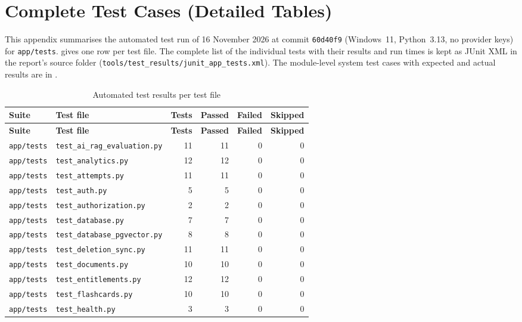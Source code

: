 \chapter{Complete Test Cases (Detailed Tables)}\label{app:tests}

This appendix summarises the automated test run of 16 November 2026 at commit \texttt{60d40f9}
(Windows~11, Python~3.13, no provider keys) for \texttt{app/tests}.  gives one row per
test file. The complete list of the individual tests with their results and run times is kept as JUnit XML
in the report's source folder (\texttt{tools/test\_results/junit\_app\_tests.xml}). The module-level system test cases with expected and
actual results are in .

{\small{}
\begin{longtable}{@{}l l r r r r@{}}
\caption{Automated test results per test file}\label{tab:fulltc}\\
\toprule
\textbf{Suite} & \textbf{Test file} & \textbf{Tests} & \textbf{Passed} & \textbf{Failed} & \textbf{Skipped}\\
\midrule
\endfirsthead
\toprule
\textbf{Suite} & \textbf{Test file} & \textbf{Tests} & \textbf{Passed} & \textbf{Failed} & \textbf{Skipped}\\
\midrule
\endhead
\bottomrule
\endfoot
\texttt{app/tests} & \texttt{test\_ai\_rag\_evaluation.py} & 11 & 11 & 0 & 0\\
\texttt{app/tests} & \texttt{test\_analytics.py} & 12 & 12 & 0 & 0\\
\texttt{app/tests} & \texttt{test\_attempts.py} & 11 & 11 & 0 & 0\\
\texttt{app/tests} & \texttt{test\_auth.py} & 5 & 5 & 0 & 0\\
\texttt{app/tests} & \texttt{test\_authorization.py} & 2 & 2 & 0 & 0\\
\texttt{app/tests} & \texttt{test\_database.py} & 7 & 7 & 0 & 0\\
\texttt{app/tests} & \texttt{test\_database\_pgvector.py} & 8 & 8 & 0 & 0\\
\texttt{app/tests} & \texttt{test\_deletion\_sync.py} & 11 & 11 & 0 & 0\\
\texttt{app/tests} & \texttt{test\_documents.py} & 10 & 10 & 0 & 0\\
\texttt{app/tests} & \texttt{test\_entitlements.py} & 12 & 12 & 0 & 0\\
\texttt{app/tests} & \texttt{test\_flashcards.py} & 10 & 10 & 0 & 0\\
\texttt{app/tests} & \texttt{test\_health.py} & 3 & 3 & 0 & 0\\

\end{longtable}}
